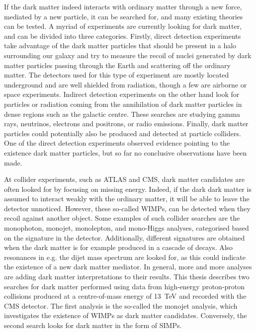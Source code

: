 If the dark matter indeed interacts with ordinary matter through a new force, mediated by a new particle, it can be searched for, and many existing theories can be tested. A myriad of experiments are currently looking for dark matter, and can be divided into three categories. Firstly, direct detection experiments take advantage of the dark matter particles that should be present in a halo surrounding our galaxy and try to measure the recoil of nuclei generated by dark matter particles passing through the Earth and scattering off the ordinary matter. The detectors used for this type of experiment are mostly located underground and are well shielded from radiation, though a few are airborne or space experiments. Indirect detection experiments on the other hand look for particles or radiation coming from the annihilation of dark matter particles in dense regions such as the galactic centre. These searches are studying gamma rays, neutrinos, electrons and positrons, or radio emissions. Finally, dark matter particles could potentially also be produced and detected at particle colliders. One of the direct detection experiments observed evidence pointing to the existence dark matter particles, but so far no conclusive observations have been made.

At collider experiments, such as \acs{ATLAS} and \acs{CMS}, dark matter candidates are often looked for by focusing on missing energy. Indeed, if the dark dark matter is assumed to interact weakly with the ordinary matter, it will be able to leave the detector unnoticed. However, these so-called \acfp{WIMP}, can be detected when they recoil against another object. Some examples of such collider searches are the monophoton, monojet, monolepton, and mono-Higgs analyses, categorised based on the signature in the detector. Additionally, different signatures are obtained when the dark matter is for example produced in a cascade of decays. Also resonances in e.g. the dijet mass spectrum are looked for, as this could indicate the existence of a new dark matter mediator. In general, more and more analyses are adding dark matter interpretations to their results. This thesis describes two searches for dark matter performed using data from high-energy proton-proton collisions produced at a centre-of-mass energy of \SI{13}{TeV} and recorded with the \acs{CMS} detector. The first analysis is the so-called the monojet analysis, which investigates the existence of \acsp{WIMP} as dark matter candidates. Conversely, the second search looks for dark matter in the form of \acfp{SIMP}.

